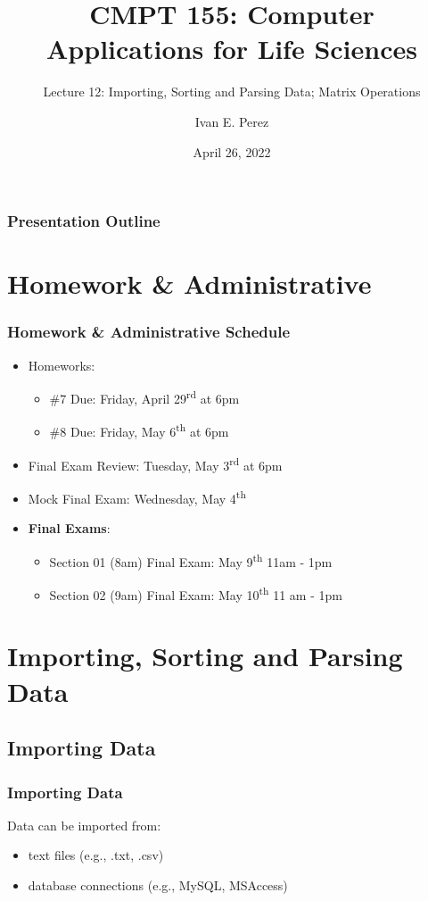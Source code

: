 \documentclass[12pt]{beamer}
\title{CMPT 155: Computer Applications for Life Sciences}
\subtitle{Lecture 12: Importing, Sorting and Parsing Data; Matrix Operations}
\author{Ivan E. Perez}
\institute{}
\date{April 26, 2022}
\begin{document}
	
	\begin{frame}
		\titlepage
	\end{frame}
	
	\begin{frame}
		\frametitle{Presentation Outline}
		\tableofcontents
	\end{frame}
	\section{Homework \& Administrative}
	
	\begin{frame}
			\frametitle{Homework \& Administrative Schedule}
		\begin{itemize}
			\item Homeworks:
			\begin{itemize}	
				\item \#7 Due: Friday, April 29\textsuperscript{rd} at 6pm
				\item \#8 Due: Friday, May 6\textsuperscript{th} at 6pm
			\end{itemize}
			\item Final Exam Review: Tuesday, May 3\textsuperscript{rd} at 6pm
			\item Mock Final Exam: Wednesday, May 4\textsuperscript{th}
			\item \textbf{Final Exams}:
			\begin{itemize}
				\item Section 01 (8am) Final Exam: May 9\textsuperscript{th} 11am - 1pm
				\item Section 02 (9am) Final Exam: May 10\textsuperscript{th} 11 am - 1pm
			\end{itemize}
		\end{itemize}
	\end{frame}
\section{Importing, Sorting and Parsing Data}
\subsection{Importing Data}
	\begin{frame}
		\frametitle{Importing Data}
		Data can be imported from:
		\begin{itemize}
			\item text files (e.g., .txt, .csv)  
			\item database connections (e.g., MySQL, MSAccess) 
		\end{itemize}	 
	\end{frame}
\end{document}
